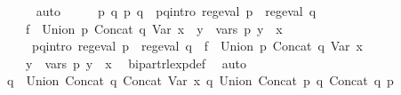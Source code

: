 \begin{isabellebody}
\ \ \ \ \isamarkupfalse%
\ auto\isanewline
\ \ \isamarkupfalse%
\ \isamarkupfalse%
\ p{}\ q{}\ p{}\ q{}\ \ p{}{\isacharunderscore}{\kern0pt}q{}{\isacharunderscore}{\kern0pt}intro{\isacharcolon}{\kern0pt}\ {\isachardoublequoteopen}reg{\isacharunderscore}{\kern0pt}eval\ p{}\ {\isasymand}\ reg{\isacharunderscore}{\kern0pt}eval\ q{}\ {\isasymand}\isanewline
\ \ \ \ f{}{\isacharprime}{\kern0pt}\ {\isacharequal}{\kern0pt}\ Union\ p{}\ {\isacharparenleft}{\kern0pt}Concat\ q{}\ {\isacharparenleft}{\kern0pt}Var\ x{\isacharparenright}{\kern0pt}{\isacharparenright}{\kern0pt}\ {\isasymand}\ {\isacharparenleft}{\kern0pt}{\isasymforall}y\ {\isasymin}\ vars\ p{}{\isachardot}{\kern0pt}\ y\ {\isasymnoteq}\ x{\isacharparenright}{\kern0pt}{\isachardoublequoteclose}\isanewline
\ \ \ \ \ p{}{\isacharunderscore}{\kern0pt}q{}{\isacharunderscore}{\kern0pt}intro{\isacharcolon}{\kern0pt}\ {\isachardoublequoteopen}reg{\isacharunderscore}{\kern0pt}eval\ p{}\ {\isasymand}\ reg{\isacharunderscore}{\kern0pt}eval\ q{}\ {\isasymand}\ f{}{\isacharprime}{\kern0pt}\ {\isacharequal}{\kern0pt}\ Union\ p{}\ {\isacharparenleft}{\kern0pt}Concat\ q{}\ {\isacharparenleft}{\kern0pt}Var\ x{\isacharparenright}{\kern0pt}{\isacharparenright}{\kern0pt}\ {\isasymand}\isanewline
\ \ \ \ {\isacharparenleft}{\kern0pt}{\isasymforall}y\ {\isasymin}\ vars\ p{}{\isachardot}{\kern0pt}\ y\ {\isasymnoteq}\ x{\isacharparenright}{\kern0pt}{\isachardoublequoteclose}\ \isamarkupfalse%
\ bipart{\isacharunderscore}{\kern0pt}rlexp{\isacharunderscore}{\kern0pt}def\ \isamarkupfalse%
\ auto\isanewline
\ \ \isamarkupfalse%
\ {\isacharquery}{\kern0pt}q{\isacharprime}{\kern0pt}\ {\isacharequal}{\kern0pt}\ {\isachardoublequoteopen}Union\ {\isacharparenleft}{\kern0pt}Concat\ q{}\ {\isacharparenleft}{\kern0pt}Concat\ {\isacharparenleft}{\kern0pt}Var\ x{\isacharparenright}{\kern0pt}\ q{}{\isacharparenright}{\kern0pt}{\isacharparenright}{\kern0pt}\ {\isacharparenleft}{\kern0pt}Union\ {\isacharparenleft}{\kern0pt}Concat\ p{}\ q{}{\isacharparenright}{\kern0pt}\ {\isacharparenleft}{\kern0pt}Concat\ q{}\ p{}{\isacharparenright}{\kern0pt}{\isacharparenright}{\kern0pt}{\isachardoublequoteclose}\isanewline

\end{isabellebody}

